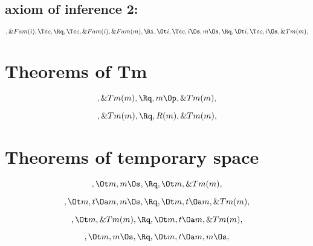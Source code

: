 \subsection{axiom of inference 2:}
\begin{math}
, \&Fam(i), \Tc c, \Rq , \Tc c, \&Fam(i), \&Fam(m), \Ri \\\\
, \Ot i, \Tc c, i \Os, m \Os, \Rq , \Ot i, \Tc c, i \Os, \&Tm(m),
\end{math}
\bigskip
\bigskip




\bigskip
\bigskip
\section{Theorems of Tm}
\[, \&Tm(m), \Rq , m \Op, \&Tm(m),\]

\[, \&Tm(m), \Rq , R(m), \&Tm(m),\]


\bigskip
\bigskip
\section{Theorems of temporary space}
\[, \Ot m, m \Os, \Rq , \Ot m, \&Tm(m),\]

\[, \Ot m, t \Oa m, m \Os, \Rq , \Ot m, t \Oa m,  \&Tm(m),\]


\[, \Ot m, \&Tm(m), \Rq , \Ot m, t \Oa m,  \&Tm(m),\]


\[, \Ot m, m \Os, \Rq , \Ot m, t \Oa m, m \Os,\]

\newpage
